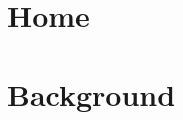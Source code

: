 \documentclass[11pt,a4paper]{article}
\begin{document}


\section*{Home}


\section*{Background}








\end{document}
